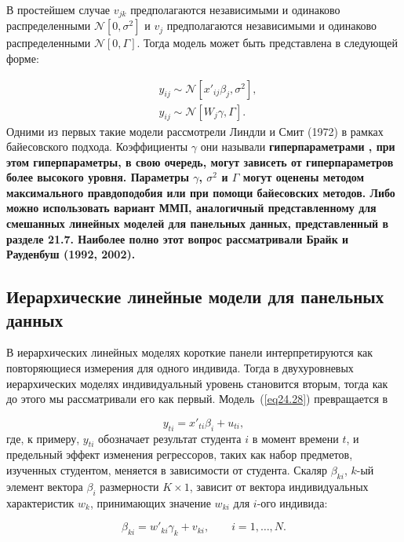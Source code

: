 В простейшем случае $v_{jk}$ предполагаются независимыми и одинаково распределенными $\mathcal N [0, \sigma^2]$ и $v_j$ предполагаются независимыми и одинаково распределенными $\mathcal N [0, \Gamma]$. Тогда модель может быть представлена в следующей форме:

\begin{align}
& y_{ij} \sim \mathcal N [x'_{ij} \beta_j, \sigma^2], \nonumber\\
& y_{ij} \sim \mathcal N [W_j \gamma, \Gamma]. \nonumber
\end{align}
Одними из первых такие модели рассмотрели Линдли и Смит (1972) в рамках байесовского подхода. Коэффициенты $\gamma$ они называли \bfseries гиперпараметрами \mdseries, при этом гиперпараметры, в свою очередь, могут зависеть от гиперпараметров более высокого уровня. Параметры $\gamma$, $\sigma^2$ и $\Gamma$ могут оценены методом максимального правдоподобия или при помощи байесовских методов. Либо можно использовать вариант ММП, аналогичный представленному для смешанных линейных моделей для панельных данных, представленный в разделе 21.7. Наиболее полно этот вопрос рассматривали Брайк и Рауденбуш (1992, 2002). 

\subsection{Иерархические линейные модели для панельных данных}

В иерархических линейных моделях короткие панели интерпретируются как повторяющиеся измерения для одного индивида. Тогда в двухуровневых иерархических моделях индивидуальный уровень становится вторым, тогда как до этого мы рассматривали его как первый. Модель~(\ref{eq24.28}) превращается в

\begin{equation}
\label{eq24.53}
y_{ti} = x'_{ti} \beta_i + u_{ti},
\end{equation}
где, к примеру, $y_{ti}$ обозначает результат студента $i$ в момент времени $t$, и предельный эффект изменения регрессоров, таких как набор предметов, изученных студентом, меняется в зависимости от студента. Скаляр $\beta_{ki}$, $k$-ый элемент вектора $\beta_i$ размерности $K \times 1$, зависит от вектора индивидуальных характеристик $w_k$, принимающих значение $w_{ki}$ для $i$-ого индивида:

\begin{equation}
\label{eq24.54}
\beta_{ki} = w'_{ki} \gamma_k + v_{ki}, \qquad i = 1, \dots, N.
\end{equation}


